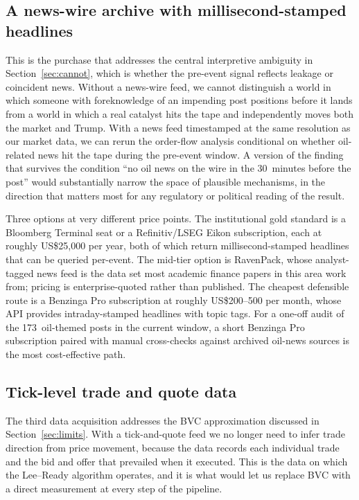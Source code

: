 \documentclass[11pt,a4paper]{article}
\begin{document}
\subsection{A news-wire archive with millisecond-stamped headlines}

This is the purchase that addresses the central interpretive ambiguity in Section~\ref{sec:cannot}, which is whether the pre-event signal reflects leakage or coincident news. Without a news-wire feed, we cannot distinguish a world in which someone with foreknowledge of an impending post positions before it lands from a world in which a real catalyst hits the tape and independently moves both the market and Trump. With a news feed timestamped at the same resolution as our market data, we can rerun the order-flow analysis conditional on whether oil-related news hit the tape during the pre-event window. A version of the finding that survives the condition ``no oil news on the wire in the 30~minutes before the post'' would substantially narrow the space of plausible mechanisms, in the direction that matters most for any regulatory or political reading of the result.

Three options at very different price points. The institutional gold standard is a Bloomberg Terminal seat or a Refinitiv/LSEG Eikon subscription, each at roughly US\$25{,}000 per year, both of which return millisecond-stamped headlines that can be queried per-event. The mid-tier option is RavenPack, whose analyst-tagged news feed is the data set most academic finance papers in this area work from; pricing is enterprise-quoted rather than published. The cheapest defensible route is a Benzinga Pro subscription at roughly US\$200--500 per month, whose API provides intraday-stamped headlines with topic tags. For a one-off audit of the 173~oil-themed posts in the current window, a short Benzinga Pro subscription paired with manual cross-checks against archived oil-news sources is the most cost-effective path.

\subsection{Tick-level trade and quote data}

The third data acquisition addresses the BVC approximation discussed in Section~\ref{sec:limits}. With a tick-and-quote feed we no longer need to infer trade direction from price movement, because the data records each individual trade and the bid and offer that prevailed when it executed. This is the data on which the Lee--Ready algorithm operates, and it is what would let us replace BVC with a direct measurement at every step of the pipeline.
\end{document}
